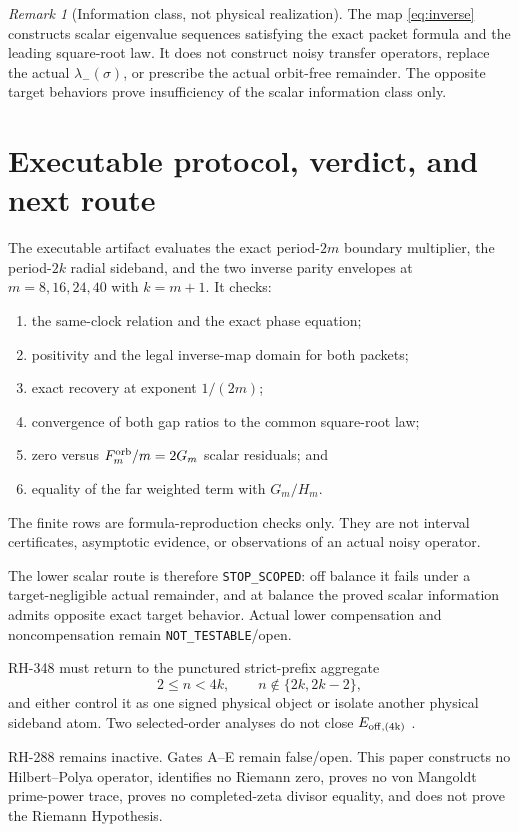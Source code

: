 \documentclass[11pt]{article}
\theoremstyle{remark}
\newtheorem{remark}[theorem]{Remark}
\begin{document}
\begin{remark}[Information class, not physical realization]
The map \eqref{eq:inverse} constructs scalar eigenvalue sequences satisfying
the exact packet formula and the leading square-root law.  It does not
construct noisy transfer operators, replace the actual
$\lambda_-(\sigma)$, or prescribe the actual orbit-free remainder.  The
opposite target behaviors prove insufficiency of the scalar information
class only.
\end{remark}

\section{Executable protocol, verdict, and next route}

The executable artifact evaluates the exact period-$2m$ boundary multiplier,
the period-$2k$ radial sideband, and the two inverse parity envelopes at
$m=8,16,24,40$ with $k=m+1$.  It checks:
\begin{enumerate}
 \item the same-clock relation and the exact phase equation;
 \item positivity and the legal inverse-map domain for both packets;
 \item exact recovery at exponent $1/(2m)$;
 \item convergence of both gap ratios to the common square-root law;
 \item zero versus $F_m^{\rm orb}/m=2G_m$ scalar residuals; and
 \item equality of the far weighted term with $G_m/H_m$.
\end{enumerate}
The finite rows are formula-reproduction checks only.  They are not interval
certificates, asymptotic evidence, or observations of an actual noisy
operator.

The lower scalar route is therefore \texttt{STOP\_SCOPED}: off balance it
fails under a target-negligible actual remainder, and at balance the proved
scalar information admits opposite exact target behavior.  Actual lower
compensation and noncompensation remain \texttt{NOT\_TESTABLE}/open.

RH-348 must return to the punctured strict-prefix aggregate
\[
 2\le n<4k,\qquad n\notin\{2k,2k-2\},
\]
and either control it as one signed physical object or isolate another
physical sideband atom.  Two selected-order analyses do not close
$E_{\rm off,(4k)}$ \citep{WangSynchronizedPrefix2026,WangActualFrontier2026,
WangCriticalPhase2026}.

RH-288 remains inactive.  Gates A--E remain false/open.  This paper
constructs no Hilbert--Polya operator, identifies no Riemann zero, proves no
von Mangoldt prime-power trace, proves no completed-zeta divisor equality,
and does not prove the Riemann Hypothesis.



\end{document}
